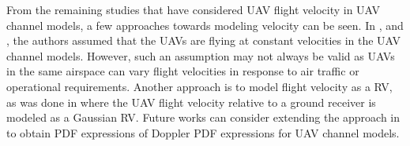 From the remaining studies that have considered UAV flight velocity in UAV channel models, a few approaches towards modeling velocity can be seen. In \cite{sharma2017uav,ono2016wireless}, and \cite{yuan2018capacity}, the authors assumed that the UAVs are flying at constant velocities in the UAV channel models. However, such an assumption may not always be valid as UAVs in the same airspace can vary flight velocities in response to air traffic or operational requirements. Another approach is to model flight velocity as a RV, as was done in \cite{pokkunuru2017capacity} where the UAV flight velocity relative to a ground receiver is modeled as a Gaussian RV. Future works can consider extending the approach in \cite{pokkunuru2017capacity} to obtain PDF expressions of Doppler PDF expressions for UAV channel models. 

%
%

